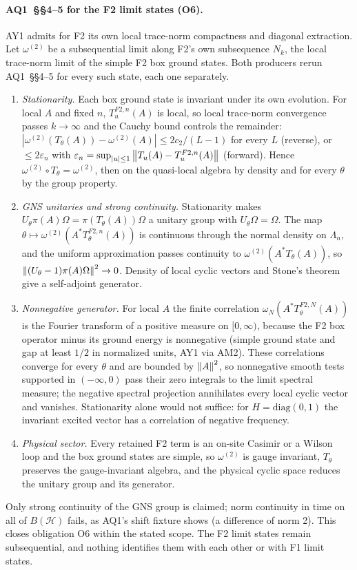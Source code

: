 \paragraph{AQ1~\S\S4--5 for the F2 limit states (O6).} AY1 admits for F2 its
own local trace-norm compactness and diagonal extraction. Let $\omega^{(2)}$
be a subsequential limit along F2's own subsequence $N_k$, the local
trace-norm limit of the simple F2 box ground states. Both producers rerun
AQ1~\S\S4--5 for every such state, each one separately.
\begin{enumerate}
\item \emph{Stationarity.} Each box ground state is invariant under its own
 evolution. For local $A$ and fixed $n$, $T^{F2,n}_u(A)$ is local, so
 local trace-norm convergence passes $k\to\infty$ and the Cauchy bound
 controls the remainder: $|\omega^{(2)}(T_\theta(A))-\omega^{(2)}(A)|\le
 2c_2/(L-1)$ for every $L$ (reverse), or $\le2\varepsilon_n$ with
 $\varepsilon_n=\sup_{|u|\le1}\left\lVert T_u(A)-T^{F2,n}_u(A)\right\rVert$ (forward). Hence
 $\omega^{(2)}\circ T_\theta=\omega^{(2)}$, then on the quasi-local algebra
 by density and for every $\theta$ by the group property.
\item \emph{GNS unitaries and strong continuity.} Stationarity makes
 $U_\theta\pi(A)\Omega=\pi(T_\theta(A))\Omega$ a unitary group with
 $U_\theta\Omega=\Omega$. The map $\theta\mapsto\omega^{(2)}(A^*T^{F2,n}_\theta
 (A))$ is continuous through the normal density on $\Lambda_n$, and the
 uniform approximation passes continuity to $\omega^{(2)}(A^*T_\theta(A))$,
 so $\left\lVert(U_\theta-1)\pi(A)\Omega\right\rVert^2\to0$. Density of local cyclic vectors
 and Stone's theorem give a self-adjoint generator.
\item \emph{Nonnegative generator.} For local $A$ the finite correlation
 $\omega_N(A^*T^{F2,N}_\theta(A))$ is the Fourier transform of a positive
 measure on $[0,\infty)$, because the F2 box operator minus its ground energy
 is nonnegative (simple ground state and gap at least $1/2$ in normalized
 units, AY1 via AM2). These correlations converge for every $\theta$ and are
 bounded by $\left\lVert A\right\rVert^2$, so nonnegative smooth tests supported in
 $(-\infty,0)$ pass their zero integrals to the limit spectral measure; the
 negative spectral projection annihilates every local cyclic vector and
 vanishes. Stationarity alone would not suffice: for $H=\mathrm{diag}(0,1)$
 the invariant excited vector has a correlation of negative frequency.
\item \emph{Physical sector.} Every retained F2 term is an on-site Casimir or a
 Wilson loop and the box ground states are simple, so $\omega^{(2)}$ is gauge
 invariant, $T_\theta$ preserves the gauge-invariant algebra, and the
 physical cyclic space reduces the unitary group and its generator.
\end{enumerate}
Only strong continuity of the GNS group is claimed; norm continuity in time
on all of $B(\mathcal H)$ fails, as AQ1's shift fixture shows (a difference
of norm 2). This closes obligation O6 within the stated scope. The F2 limit
states remain subsequential, and nothing identifies them with each other or
with F1 limit states.

